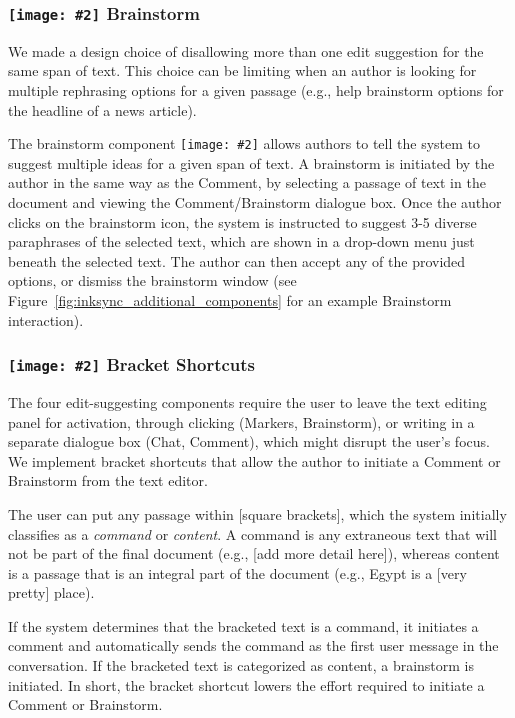 \documentclass[manuscript]{acmart}
\newcommand{\symbolimg}[2][0.4cm]{%
  \texttt{[image: \#2]}%
}
\begin{document}
\subsubsection{\symbolimg{figures/icons/brainstorm.png} Brainstorm} \label{sec:brainstorm}

We made a design choice of disallowing more than one edit suggestion for the same span of text. This choice can be limiting when an author is looking for multiple rephrasing options for a given passage (e.g., help brainstorm options for the headline of a news article).

The brainstorm component \symbolimg[0.3cm]{figures/icons/brainstorm.png} allows authors to tell the system to suggest multiple ideas for a given span of text. 
A brainstorm is initiated by the author in the same way as the Comment, by selecting a passage of text in the document and viewing the Comment/Brainstorm dialogue box. Once the author clicks on the brainstorm icon, the system is instructed to suggest 3-5 diverse paraphrases of the selected text, which are shown in a drop-down menu just beneath the selected text. The author can then accept any of the provided options, or dismiss the brainstorm window (see Figure~\ref{fig:inksync_additional_components} for an example Brainstorm interaction).

\subsubsection{\symbolimg{figures/icons/shortcuts.png} Bracket Shortcuts} \label{sec:shortcuts}

The four edit-suggesting components require the user to leave the text editing panel for activation, through clicking (Markers, Brainstorm), or writing in a separate dialogue box (Chat, Comment), which might disrupt the user's focus. We implement bracket shortcuts that allow the author to initiate a Comment or Brainstorm from the text editor.

The user can put any passage within [square brackets], which the system initially classifies as a \textit{command} or \textit{content}. A command is any extraneous text that will not be part of the final document (e.g., [add more detail here]), whereas content is a passage that is an integral part of the document (e.g., Egypt is a [very pretty] place).

If the system determines that the bracketed text is a command, it initiates a comment and automatically sends the command as the first user message in the conversation. If the bracketed text is categorized as content, a brainstorm is initiated. In short, the bracket shortcut lowers the effort required to initiate a Comment or Brainstorm.
\end{document}
